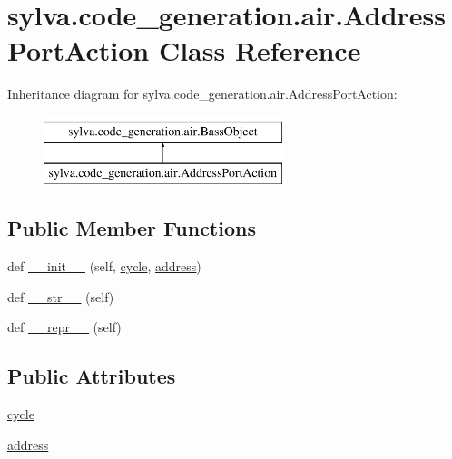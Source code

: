 \hypertarget{classsylva_1_1code__generation_1_1air_1_1_address_port_action}{}\section{sylva.\+code\+\_\+generation.\+air.\+Address\+Port\+Action Class Reference}
\label{classsylva_1_1code__generation_1_1air_1_1_address_port_action}
Inheritance diagram for sylva.\+code\+\_\+generation.\+air.\+Address\+Port\+Action\+:\begin{figure}[H]
\begin{center}
\leavevmode
\includegraphics[height=2.000000cm]{classsylva_1_1code__generation_1_1air_1_1_address_port_action}
\end{center}
\end{figure}
\subsection*{Public Member Functions}
\begin{DoxyCompactItemize}
\item 
def \hyperlink{classsylva_1_1code__generation_1_1air_1_1_address_port_action_a55bb107bc3e09993e527f5ab0db08c0a}{\+\_\+\+\_\+init\+\_\+\+\_\+} (self, \hyperlink{classsylva_1_1code__generation_1_1air_1_1_address_port_action_aa6bd7cd1cbf6cf3a36e02329a88affbf}{cycle}, \hyperlink{classsylva_1_1code__generation_1_1air_1_1_address_port_action_a6a2ed473ad0902a5fb0128e61b42c988}{address})
\item 
def \hyperlink{classsylva_1_1code__generation_1_1air_1_1_bass_object_a2c164720220479369c29db97b67aabe8}{\+\_\+\+\_\+str\+\_\+\+\_\+} (self)
\item 
def \hyperlink{classsylva_1_1code__generation_1_1air_1_1_bass_object_a17548b84b2a55240a429506aed418292}{\+\_\+\+\_\+repr\+\_\+\+\_\+} (self)
\end{DoxyCompactItemize}
\subsection*{Public Attributes}
\begin{DoxyCompactItemize}
\item 
\hyperlink{classsylva_1_1code__generation_1_1air_1_1_address_port_action_aa6bd7cd1cbf6cf3a36e02329a88affbf}{cycle}
\item 
\hyperlink{classsylva_1_1code__generation_1_1air_1_1_address_port_action_a6a2ed473ad0902a5fb0128e61b42c988}{address}
\end{DoxyCompactItemize}


